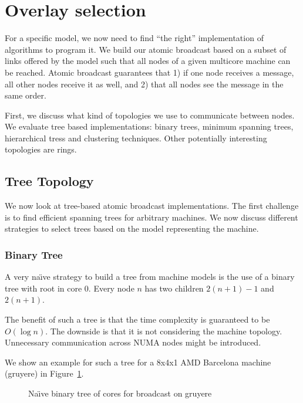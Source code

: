\documentclass{article}
\newcommand{\naive}{na\"{\i}ve\xspace}
\newcommand{\Naive}{Na\"{\i}ve\xspace}
\begin{document}
\section{Overlay selection}
\label{sec:overlay}

For a specific model, we now need to find ``the right'' implementation
of algorithms to program it. We build our atomic broadcast based on a
subset of links offered by the model such that all nodes of a given
multicore machine can be reached. Atomic broadcast guarantees that 1)
if one node receives a message, all other nodes receive it as well,
and 2) that all nodes see the message in the same order.

First, we discuss what kind of topologies we use to communicate
between nodes. We evaluate tree based implementations: binary trees,
minimum spanning trees, hierarchical tress and clustering
techniques. Other potentially interesting topologies are rings.

\subsection{Tree Topology}

We now look at tree-based atomic broadcast implementations. The first
challenge is to find efficient spanning trees for arbitrary
machines. We now discuss different strategies to select trees based on
the model representing the machine.

\subsubsection{Binary Tree}

A very \naive strategy to build a tree from machine models is the use
of a binary tree with root in core 0. Every node $n$ has two children
$2(n+1)-1$ and $2(n+1)$.

The benefit of such a tree is that the time complexity is guaranteed
to be $O(\log{n})$. The downside is that it is not considering the
machine topology. Unnecessary communication across NUMA nodes might be
introduced. 

We show an example for such a tree for a 8x4x1 AMD Barcelona machine
(gruyere) in Figure~\ref{fig:qrm_tree_gruyere}.

\begin{figure}
  
  \caption{\Naive binary tree of cores for broadcast on gruyere}
  \label{fig:qrm_tree_gruyere}
\end{figure}
\end{document}
